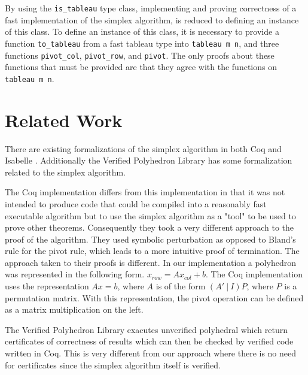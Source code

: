\documentclass[11pt]{article} %
\begin{document}
By using the \lstinline|is_tableau| type class, implementing and proving correctness of a fast implementation of the simplex algorithm, is reduced to defining an instance of this class. To define an instance of this class, it is necessary to provide a function \lstinline|to_tableau| from a fast tableau type into \lstinline|tableau m n|, and three functions \lstinline|pivot_col|, \lstinline|pivot_row|, and \lstinline|pivot|. The only proofs about these functions that must be provided are that they agree with the functions on \lstinline|tableau m n|. 

\section{Related Work}


There are existing formalizations of the simplex algorithm in both Coq \cite{DBLP:journals/corr/AllamigeonK17} and Isabelle \cite{10.1007/978-3-642-32759-9_35}. Additionally the Verified Polyhedron Library \cite{8750763} has some formalization related to the simplex algorithm.

The Coq implementation \cite{DBLP:journals/corr/AllamigeonK17} differs from this implementation in that it was not intended to produce code that could be compiled into a reasonably fast executable algorithm but to use the simplex algorithm as a "tool" to be used to prove other theorems. Consequently they took a very different approach to the proof of the algorithm. They used symbolic perturbation as opposed to Bland's rule for the pivot rule, which leads to a more intuitive proof of termination. The approach taken to their proofs is different. In our implementation a polyhedron was represented in the following form.
$x_{row} = A x_{col} + b$. The Coq implementation uses the representation $Ax = b$, where $A$ is of the form $(A'\ |\ I)P$, where $P$ is a permutation matrix. With this representation, the pivot operation can be defined as a matrix multiplication on the left.

The Verified Polyhedron Library \cite{8750763} exacutes unverified polyhedral which return certificates of correctness of results which can then be checked by verified code written in Coq. This is very different from our approach where there is no need for certificates since the simplex algorithm itself is verified.
\end{document}
